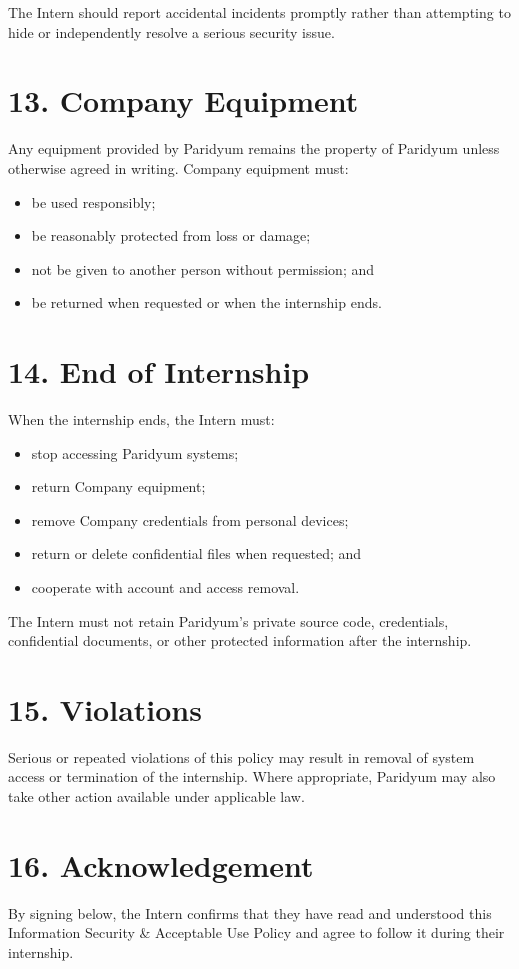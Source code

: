 \documentclass{paridyum}
\begin{document}
\vspace{0.3em}
The Intern should report accidental incidents promptly rather than attempting to hide
or independently resolve a serious security issue.

\section*{13. Company Equipment}
Any equipment provided by Paridyum remains the property of Paridyum unless otherwise
agreed in writing. Company equipment must:
\begin{itemize}[leftmargin=*, noitemsep]
    \item be used responsibly;
    \item be reasonably protected from loss or damage;
    \item not be given to another person without permission; and
    \item be returned when requested or when the internship ends.
\end{itemize}

\section*{14. End of Internship}
When the internship ends, the Intern must:
\begin{itemize}[leftmargin=*, noitemsep]
    \item stop accessing Paridyum systems;
    \item return Company equipment;
    \item remove Company credentials from personal devices;
    \item return or delete confidential files when requested; and
    \item cooperate with account and access removal.
\end{itemize}
The Intern must not retain Paridyum's private source code, credentials, confidential
documents, or other protected information after the internship.

\section*{15. Violations}
Serious or repeated violations of this policy may result in removal of system access or
termination of the internship. Where appropriate, Paridyum may also take other action
available under applicable law.

\section*{16. Acknowledgement}
By signing below, the Intern confirms that they have read and understood this
Information Security \& Acceptable Use Policy and agree to follow it during their
internship.

\vspace{1.5em}
\paridyumsignblock

\vspace{1.5em}
\end{document}
